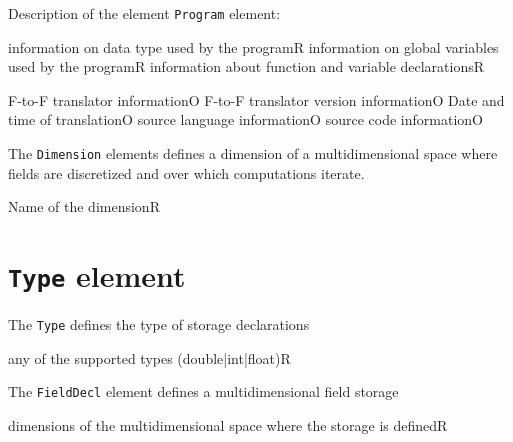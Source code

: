 
Description of the element {\tt Program} element:


\begin{HIRChildElements}
{information on data type used by the program}{R}
{information on global variables used by the program}{R}
{information about function and variable declarations}{R}
\end{HIRChildElements}

\begin{HIRAttributes}
{F-to-F translator information}{O}
{F-to-F translator version information}{O}
{Date and time of translation}{O}
{source language information}{O}
{source code information}{O}
\end{HIRAttributes}


The {\tt Dimension} elements defines a dimension of a multidimensional space where fields are discretized and over which computations iterate. 

\HIRContentsModel{ () }
\begin{HIRAttributes}
	{Name of the dimension}{R}
\end{HIRAttributes}

\section{ {\tt Type} element}

The {\tt Type} defines the type of storage declarations
\HIRContentsModel{ () }

\begin{HIRAttributes}
	{any of the supported types (double|int|float)}{R}
\end{HIRAttributes}

The {\tt FieldDecl} element defines a multidimensional field storage

\begin{HIRChildElements}
	{dimensions of the multidimensional space where the storage is defined}{R}
\end{HIRChildElements}

